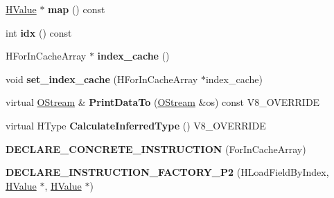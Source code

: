 \begin{DoxyCompactItemize}
\item 
\hypertarget{classv8_1_1internal_1_1_v8___f_i_n_a_l_acea171fc87070eb983bebc902b544882}{}\hyperlink{classv8_1_1internal_1_1_h_value}{H\+Value} $\ast$ {\bfseries map} () const \label{classv8_1_1internal_1_1_v8___f_i_n_a_l_acea171fc87070eb983bebc902b544882}

\item 
\hypertarget{classv8_1_1internal_1_1_v8___f_i_n_a_l_a1a8f5969d8eb73421c297eaffcb323f7}{}int {\bfseries idx} () const \label{classv8_1_1internal_1_1_v8___f_i_n_a_l_a1a8f5969d8eb73421c297eaffcb323f7}

\item 
\hypertarget{classv8_1_1internal_1_1_v8___f_i_n_a_l_a72d099797e3660287c51ab375fc6a475}{}H\+For\+In\+Cache\+Array $\ast$ {\bfseries index\+\_\+cache} ()\label{classv8_1_1internal_1_1_v8___f_i_n_a_l_a72d099797e3660287c51ab375fc6a475}

\item 
\hypertarget{classv8_1_1internal_1_1_v8___f_i_n_a_l_a2c7c8e71603a82b68b8af9fb233e82ce}{}void {\bfseries set\+\_\+index\+\_\+cache} (H\+For\+In\+Cache\+Array $\ast$index\+\_\+cache)\label{classv8_1_1internal_1_1_v8___f_i_n_a_l_a2c7c8e71603a82b68b8af9fb233e82ce}

\item 
\hypertarget{classv8_1_1internal_1_1_v8___f_i_n_a_l_ac450dad970b14246be761ccf5004924b}{}virtual \hyperlink{classv8_1_1internal_1_1_o_stream}{O\+Stream} \& {\bfseries Print\+Data\+To} (\hyperlink{classv8_1_1internal_1_1_o_stream}{O\+Stream} \&os) const V8\+\_\+\+O\+V\+E\+R\+R\+I\+D\+E\label{classv8_1_1internal_1_1_v8___f_i_n_a_l_ac450dad970b14246be761ccf5004924b}

\item 
\hypertarget{classv8_1_1internal_1_1_v8___f_i_n_a_l_a7a6782b8660ab150601db2ff28262edd}{}virtual H\+Type {\bfseries Calculate\+Inferred\+Type} () V8\+\_\+\+O\+V\+E\+R\+R\+I\+D\+E\label{classv8_1_1internal_1_1_v8___f_i_n_a_l_a7a6782b8660ab150601db2ff28262edd}

\item 
\hypertarget{classv8_1_1internal_1_1_v8___f_i_n_a_l_a5e4162629392cbdbf7335f87e669cda7}{}{\bfseries D\+E\+C\+L\+A\+R\+E\+\_\+\+C\+O\+N\+C\+R\+E\+T\+E\+\_\+\+I\+N\+S\+T\+R\+U\+C\+T\+I\+O\+N} (For\+In\+Cache\+Array)\label{classv8_1_1internal_1_1_v8___f_i_n_a_l_a5e4162629392cbdbf7335f87e669cda7}

\item 
\hypertarget{classv8_1_1internal_1_1_v8___f_i_n_a_l_aa5870006c75431a8c4eb66e38d350c1b}{}{\bfseries D\+E\+C\+L\+A\+R\+E\+\_\+\+I\+N\+S\+T\+R\+U\+C\+T\+I\+O\+N\+\_\+\+F\+A\+C\+T\+O\+R\+Y\+\_\+\+P2} (H\+Load\+Field\+By\+Index, \hyperlink{classv8_1_1internal_1_1_h_value}{H\+Value} $\ast$, \hyperlink{classv8_1_1internal_1_1_h_value}{H\+Value} $\ast$)\label{classv8_1_1internal_1_1_v8___f_i_n_a_l_aa5870006c75431a8c4eb66e38d350c1b}


\end{DoxyCompactItemize}
